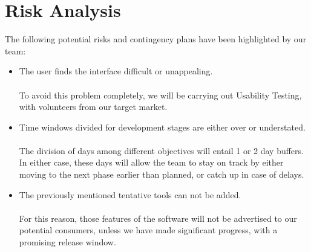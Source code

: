 \documentclass[a4paper, 11pt]{article}
\begin{document}
\section{Risk Analysis}
The following potential risks and contingency plans have been highlighted by our team:
\begin{itemize}
    \item The user finds the interface difficult or unappealing.
    \paragraph{} To avoid this problem completely, we will be carrying out Usability Testing, with volunteers from our target market.
    \item Time windows divided for development stages are either over or understated.
    \paragraph{}The division of days among different objectives will entail 1 or 2 day buffers. In either case, these days will allow the team to stay on track by either moving to the next phase earlier than planned, or catch up in case of delays.
    \item The previously mentioned tentative tools can not be added.
    \paragraph{} For this reason, those features of the software will not be advertised to our potential consumers, unless we have made significant progress, with a promising release window.
\end{itemize}
\end{document}
